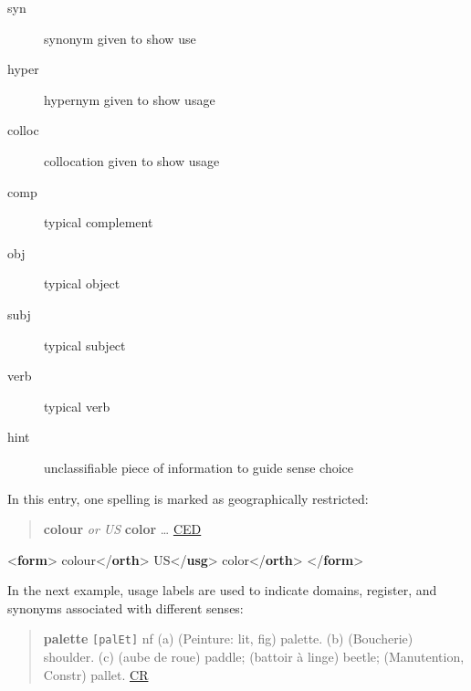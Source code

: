 \begin{description}
\item[{syn}]synonym given to show use
\item[{hyper}]hypernym given to show usage
\item[{colloc}]collocation given to show usage
\item[{comp}]typical complement
\item[{obj}]typical object
\item[{subj}]typical subject
\item[{verb}]typical verb
\item[{hint}]unclassifiable piece of information to guide sense choice
\end{description} \par
In this entry, one spelling is marked as geographically restricted:
\begin{quote}{\bfseries colour} {\itshape or US} {\bfseries color} … \hyperref[DIC-CED]{CED}\end{quote}
 \par\bgroup{}\exampleFont \begin{shaded}\noindent\mbox{}{<\textbf{form}>}\mbox{}\newline 
{}colour{</\textbf{orth}>}\mbox{}\newline 
{}\mbox{}\newline 
\hspace*{1em}US{</\textbf{usg}>}\mbox{}\newline 
\hspace*{1em}color{</\textbf{orth}>}\mbox{}\newline 
{}\mbox{}\newline 
{</\textbf{form}>}\end{shaded}\egroup\par \par
In the next example, usage labels are used to indicate domains, register, and synonyms associated with different senses:
\begin{quote}{\bfseries palette} \texttt{[palEt]} nf (a) (Peinture: lit, fig) palette. (b) (Boucherie) shoulder. (c) (aube de roue) paddle; (battoir à linge) beetle; (Manutention, Constr) pallet. \hyperref[DIC-CR]{CR}\end{quote}
